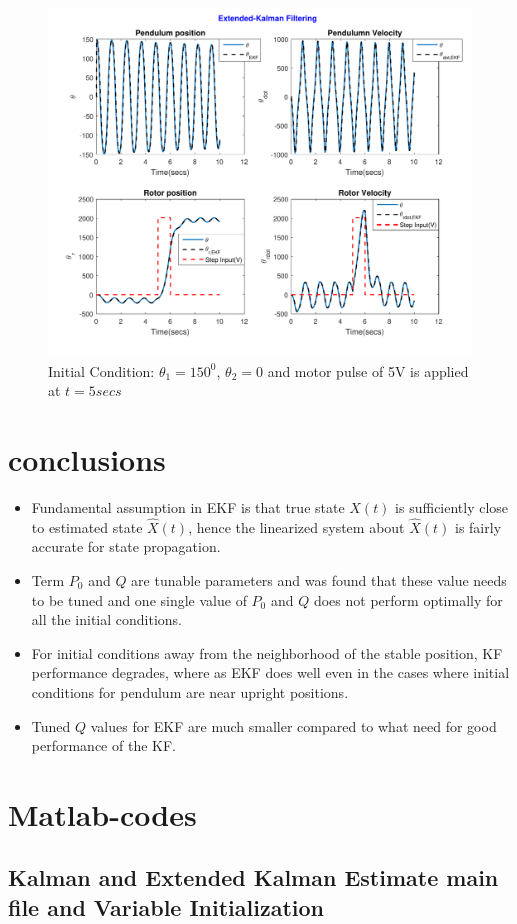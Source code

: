 \documentclass[a4paper]{article}
\begin{document}
\begin{figure}
\centering
\includegraphics[width=0.7\linewidth]{fig/plot_2_ekf_4}
\caption{Initial Condition: $\theta_1 = 150^0$, $\theta_2 = 0$ and motor pulse of 5V is applied at $t = 5secs$}
\label{fig:plot_2_ekf_4}
\end{figure}

\section{conclusions}
\begin{itemize}
	\item Fundamental assumption in EKF is that true state $X(t)$ is sufficiently close to estimated state $\hat X(t)$, hence the linearized system about $\hat X(t)$ is fairly accurate for state propagation.
	\item Term $P_0$ and $Q$ are tunable parameters and was found that these value needs to be tuned and one single value of $P_0$ and $Q$ does not perform optimally for all the initial conditions.
	\item For initial conditions away from the neighborhood of the stable position, KF performance degrades, where as EKF does well even in the cases where initial conditions for pendulum are near upright positions.
	\item Tuned $Q$ values for EKF are much smaller compared to what need for good performance of the KF.
\end{itemize}
\section{Matlab-codes}
\subsection{Kalman and Extended Kalman Estimate main file and Variable Initialization}


\end{document}
